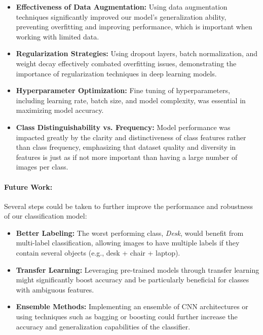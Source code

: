 \documentclass[10pt]{article}
\begin{document}
\begin{itemize}
\item \textbf{Effectiveness of Data Augmentation:} Using data augmentation techniques significantly improved our model's generalization ability, preventing overfitting and improving performance, which is important when working with limited data.

\item \textbf{Regularization Strategies:} Using dropout layers, batch normalization, and weight decay effectively combated overfitting issues, demonstrating the importance of regularization techniques in deep learning models.

\item \textbf{Hyperparameter Optimization:} Fine tuning of hyperparameters, including learning rate, batch size, and model complexity, was essential in maximizing model accuracy.

\item \textbf{Class Distinguishability vs. Frequency:} Model performance was impacted greatly by the clarity and distinctiveness of class features rather than class frequency, emphasizing that dataset quality and diversity in features is just as if not more important than having a large number of images per class.

\end{itemize}

\paragraph{Future Work:}
Several steps could be taken to further improve the performance and robustness of our classification model:

\begin{itemize}
\item \textbf{Better Labeling:} The worst performing class, \emph{Desk}, would benefit from multi-label classification,  allowing images to have multiple labels if they contain several objects (e.g., desk + chair + laptop).

\item \textbf{Transfer Learning:} Leveraging pre-trained models through transfer learning might significantly boost accuracy and be particularly beneficial for classes with ambiguous features.

\item \textbf{Ensemble Methods:} Implementing an ensemble of CNN architectures or using techniques such as bagging or boosting could further increase the accuracy and generalization capabilities of the classifier.

\end{itemize}
\end{document}
